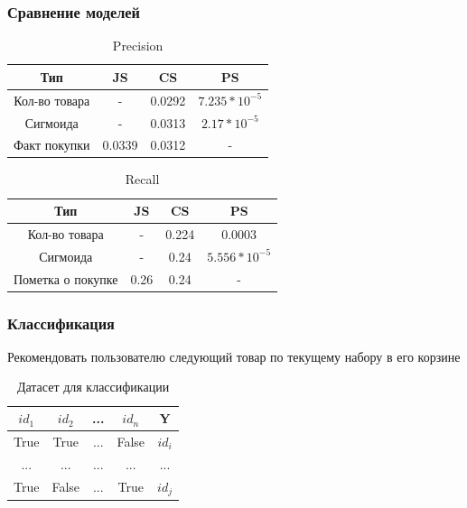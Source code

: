 \documentclass[10pt, unicode]{beamer}
\begin{document}
\begin{frame}
  \frametitle{Сравнение моделей}

  \begin{table}[H]
    \centering
    \begin{tabular} { | c | c | c | c | }
      \hline
      Тип & JS & CS & PS \\
      \hline
      Кол-во товара & - & 0.0292 & $7.235 * 10^{-5}$ \\
      \hline
      Сигмоида & - & 0.0313 & $2.17 * 10^{-5}$ \\
      \hline
      Факт покупки & 0.0339 & 0.0312 & - \\
      \hline
    \end{tabular}
    \caption{Precision}
  \end{table}

  \begin{table}[H]
    \centering
    \begin{tabular} { | c | c | c | c | }
      \hline
      Тип & JS & CS & PS \\
      \hline
      Кол-во товара & - & 0.224 & 0.0003\\
      \hline
      Сигмоида & - & 0.24 & $5.556 * 10^{-5}$ \\
      \hline
      Пометка о покупке & 0.26 & 0.24 & - \\
      \hline
    \end{tabular}
    \caption{Recall}
  \end{table}

\end{frame}

\begin{frame}
  \frametitle{Классификация}
  Рекомендовать пользователю следующий товар по текущему набору в его корзине
  \begin{table}[H]
    \centering
    \begin{tabular} { | c | c | c | c | c | }
    \hline
    $id_1$ & $id_2$ & ... & $id_n$ & Y \\
    \hline
    True  & True  & ... & False & $id_i$ \\
    \hline
    ...  & ...  & ... & ... & ... \\
    \hline
    True  & False  & ... & True & $id_j$ \\
    \hline
    \end{tabular}
    \caption{Датасет для классификации}
  \end{table}
\end{frame}
\end{document}
